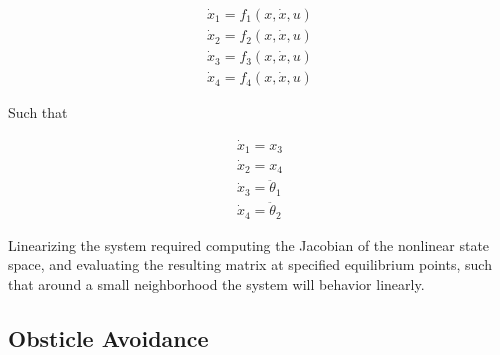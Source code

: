 \documentclass[journal]{IEEEtran}
\begin{document}
\begin{equation}
\begin{array}{l}
\dot{x}_{1}=f_{1}(x, \dot{x}, u) \\
\dot{x}_{2}=f_{2}(x, \dot{x}, u) \\
\dot{x}_{3}=f_{3}(x, \dot{x}, u) \\
\dot{x}_{4}=f_{4}(x, \dot{x}, u)
\end{array}
\end{equation}


Such that


\begin{equation}
\begin{array}{l}
\dot{x}_{1}=x_{3} \\
\dot{x}_{2}=x_{4} \\
\dot{x}_{3}=\ddot{\theta}_{1} \\
\dot{x}_{4}=\ddot{\theta}_{2}
\end{array}
\end{equation}



Linearizing the system required computing the Jacobian of the nonlinear state space, and evaluating the resulting matrix at specified equilibrium points, such that around a small neighborhood the system will behavior linearly.



\subsection{Obsticle Avoidance}
%
%
%
%
%
\end{document}
